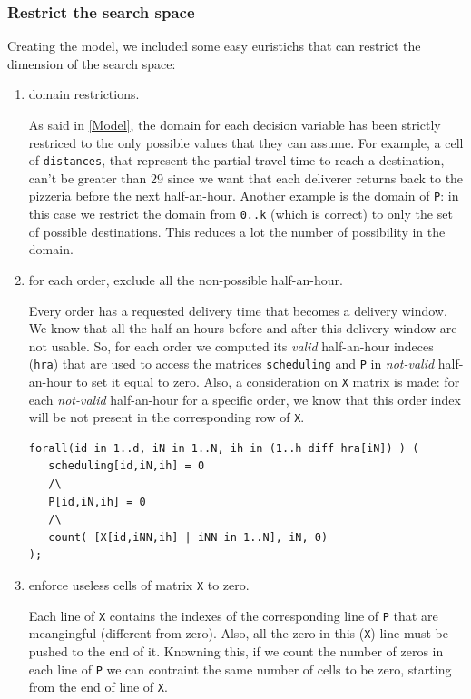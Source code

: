 \documentclass[10pt]{article}
\begin{document}
	\subsubsection{Restrict the search space}
	\label{subsubsec:restrict-search-space}
	Creating the model, we included some easy euristichs that can restrict the dimension
	of the search space:

	\begin{enumerate}

		\item domain restrictions.
		
		As said in \cref{Model}, the domain for each decision variable has been
		strictly restriced to the only possible values that they can assume. 
		For example, a cell of \texttt{distances}, that represent the partial travel time
		to reach a destination, can't be greater than 29 since we want that each deliverer 
		returns back to the pizzeria before the next half-an-hour. Another example is the domain
		of \texttt{P}: in this case we restrict the domain from \texttt{0..k} (which is correct) 
		to only the set of possible destinations. This reduces a lot the number of possibility in 
		the domain. 

		\item for each order, exclude all the non-possible half-an-hour.
		
		Every order has a requested delivery time that becomes a delivery window. 
		We know that all the half-an-hours before and after this delivery window
		are not usable. So, for each order we computed its \textit{valid} half-an-hour 
		indeces (\texttt{hra}) that are used to access the matrices \texttt{scheduling}
		and \texttt{P} in \textit{not-valid} half-an-hour to set it equal to zero.   
		Also, a consideration on \texttt{X} matrix is made: for each \textit{not-valid} 
		half-an-hour for a specific order, we know that this order index will be not present
		in the corresponding row of \texttt{X}.


		\begin{verbatim}
forall(id in 1..d, iN in 1..N, ih in (1..h diff hra[iN]) ) (
   scheduling[id,iN,ih] = 0
   /\
   P[id,iN,ih] = 0
   /\
   count( [X[id,iNN,ih] | iNN in 1..N], iN, 0)
);
		\end{verbatim}

		\item enforce useless cells of matrix \texttt{X} to zero.
		
		Each line of \texttt{X} contains the indexes of the corresponding line of \texttt{P}
		that are meangingful (different from zero). Also, all the zero in this (\texttt{X}) 
		line must be pushed to the end of it. Knowning this, if we count the number of zeros
		in each line of \texttt{P} we can contraint the same number of cells to be zero, starting
		from the end of line of \texttt{X}.


\end{enumerate}
\end{document}
